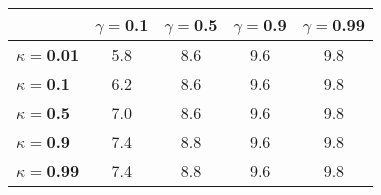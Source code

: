 \begin{tabular}{|l|c|c|c|c|}
\hline
&\textbf{$\gamma =$0.1}&\textbf{$\gamma =$0.5}&\textbf{$\gamma =$0.9}&\textbf{$\gamma =$0.99}\\\hline
\textbf{$\kappa =$0.01}&5.8&8.6&9.6&9.8\\\hline
\textbf{$\kappa =$0.1}&6.2&8.6&9.6&9.8\\\hline
\textbf{$\kappa =$0.5}&7.0&8.6&9.6&9.8\\\hline
\textbf{$\kappa =$0.9}&7.4&8.8&9.6&9.8\\\hline
\textbf{$\kappa =$0.99}&7.4&8.8&9.6&9.8\\\hline
\end{tabular}
